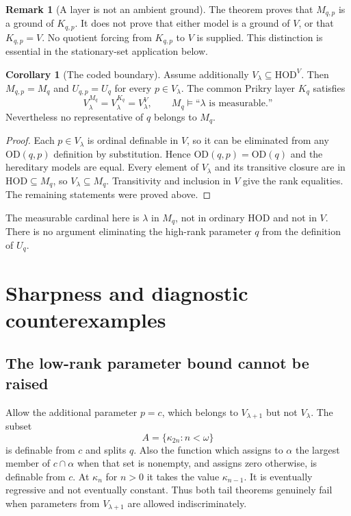 \documentclass[11pt,letterpaper]{article}
\theoremstyle{definition}
\newtheorem{corollary}[definition]{Corollary}
\newtheorem{remark}[definition]{Remark}
\numberwithin{equation}{section}
\newcommand{\HOD}{\mathrm{HOD}}
\newcommand{\OD}{\mathrm{OD}}
\begin{document}
\begin{remark}[A layer is not an ambient ground]
The theorem proves that $M_{q,p}$ is a ground of $K_{q,p}$. It does not
prove that either model is a ground of $V$, or that $K_{q,p}=V$.
No quotient forcing from $K_{q,p}$ to $V$ is supplied. This distinction
is essential in the stationary-set application below.
\end{remark}

\begin{corollary}[The coded boundary]\label{cor:boundary}
Assume additionally $V_\lambda\subseteq\HOD^V$. Then
$M_{q,p}=M_q$ and $U_{q,p}=U_q$ for every $p\in V_\lambda$.
The common Prikry layer $K_q$ satisfies
\[
 V_\lambda^{M_q}=V_\lambda^{K_q}=V_\lambda^V,
 \qquad
 M_q\models\text{``$\lambda$ is measurable.''}
\]
Nevertheless no representative of $q$ belongs to $M_q$.
\end{corollary}

\begin{proof}
Each $p\in V_\lambda$ is ordinal definable in $V$, so it can be
eliminated from any $\OD(q,p)$ definition by substitution. Hence
$\OD(q,p)=\OD(q)$ and the hereditary models are equal. Every element
of $V_\lambda$ and its transitive closure are in $\HOD\subseteq M_q$,
so $V_\lambda\subseteq M_q$. Transitivity and inclusion in $V$ give the
rank equalities. The remaining statements were proved above.
\end{proof}

The measurable cardinal here is $\lambda$ in $M_q$, not in ordinary
$\HOD$ and not in $V$. There is no argument eliminating the high-rank
parameter $q$ from the definition of $U_q$.

\section{Sharpness and diagnostic counterexamples}\label{sec:sharp}

\subsection{The low-rank parameter bound cannot be raised}

Allow the additional parameter $p=c$, which belongs to
$V_{\lambda+1}$ but not $V_\lambda$. The subset
\[
 A=\{\kappa_{2n}:n<\omega\}
\]
is definable from $c$ and splits $q$. Also the function which assigns
to $\alpha$ the largest member of $c\cap\alpha$ when that set is
nonempty, and assigns zero otherwise, is definable from $c$.
At $\kappa_n$ for $n>0$ it takes the value $\kappa_{n-1}$.
It is eventually regressive and not eventually constant.
Thus both tail theorems genuinely fail when parameters from
$V_{\lambda+1}$ are allowed indiscriminately.
\end{document}
